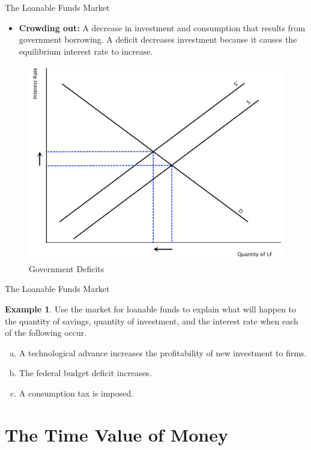 \documentclass[xcolor={dvipsnames},pdf, hyperref={colorlinks=true, citecolor=ForestGreen, linkcolor=BlueViolet, urlcolor=Magenta}]{beamer}
\theoremstyle{definition}
\newtheorem{exmp}{Example}[section]
\newcommand{\defn}[1]{\textbf{#1}}
\begin{document}
\begin{frame}{The Loanable Funds Market}
\begin{itemize}
	\item 	\defn{Crowding out:} A decrease in investment and consumption that results from government borrowing. A deficit decreases investment because it causes the equilibrium interest rate to increase.
\end{itemize}
	\begin{figure}[H]
		\centering
	\includegraphics[scale=.35]{plot92.pdf}
	\caption{Government Deficits}
	\end{figure}
\end{frame}

\begin{frame}{The Loanable Funds Market}
\begin{exmp}
	Use the market for loanable funds to explain what will happen to the quantity of savings, quantity of investment, and the interest rate when each of the following occur.
	\begin{enumerate}[(a)]
		\item A technological advance increases the profitability of new investment to firms.
		\item The federal budget deficit increases.
		\item A consumption tax is imposed.
	\end{enumerate}
\end{exmp}
\end{frame}

\section{The Time Value of Money}
\end{document}
